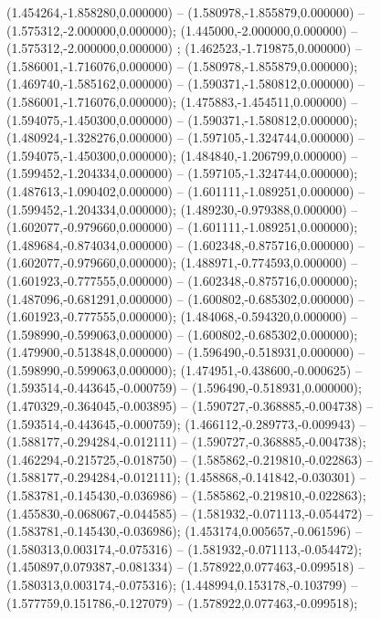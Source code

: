  (1.454264,-1.858280,0.000000) -- (1.580978,-1.855879,0.000000) -- (1.575312,-2.000000,0.000000);
 (1.445000,-2.000000,0.000000) -- (1.575312,-2.000000,0.000000) ;
 (1.462523,-1.719875,0.000000) -- (1.586001,-1.716076,0.000000) -- (1.580978,-1.855879,0.000000);
 (1.469740,-1.585162,0.000000) -- (1.590371,-1.580812,0.000000) -- (1.586001,-1.716076,0.000000);
 (1.475883,-1.454511,0.000000) -- (1.594075,-1.450300,0.000000) -- (1.590371,-1.580812,0.000000);
 (1.480924,-1.328276,0.000000) -- (1.597105,-1.324744,0.000000) -- (1.594075,-1.450300,0.000000);
 (1.484840,-1.206799,0.000000) -- (1.599452,-1.204334,0.000000) -- (1.597105,-1.324744,0.000000);
 (1.487613,-1.090402,0.000000) -- (1.601111,-1.089251,0.000000) -- (1.599452,-1.204334,0.000000);
 (1.489230,-0.979388,0.000000) -- (1.602077,-0.979660,0.000000) -- (1.601111,-1.089251,0.000000);
 (1.489684,-0.874034,0.000000) -- (1.602348,-0.875716,0.000000) -- (1.602077,-0.979660,0.000000);
 (1.488971,-0.774593,0.000000) -- (1.601923,-0.777555,0.000000) -- (1.602348,-0.875716,0.000000);
 (1.487096,-0.681291,0.000000) -- (1.600802,-0.685302,0.000000) -- (1.601923,-0.777555,0.000000);
 (1.484068,-0.594320,0.000000) -- (1.598990,-0.599063,0.000000) -- (1.600802,-0.685302,0.000000);
 (1.479900,-0.513848,0.000000) -- (1.596490,-0.518931,0.000000) -- (1.598990,-0.599063,0.000000);
 (1.474951,-0.438600,-0.000625) -- (1.593514,-0.443645,-0.000759) -- (1.596490,-0.518931,0.000000);
 (1.470329,-0.364045,-0.003895) -- (1.590727,-0.368885,-0.004738) -- (1.593514,-0.443645,-0.000759);
 (1.466112,-0.289773,-0.009943) -- (1.588177,-0.294284,-0.012111) -- (1.590727,-0.368885,-0.004738);
 (1.462294,-0.215725,-0.018750) -- (1.585862,-0.219810,-0.022863) -- (1.588177,-0.294284,-0.012111);
 (1.458868,-0.141842,-0.030301) -- (1.583781,-0.145430,-0.036986) -- (1.585862,-0.219810,-0.022863);
 (1.455830,-0.068067,-0.044585) -- (1.581932,-0.071113,-0.054472) -- (1.583781,-0.145430,-0.036986);
 (1.453174,0.005657,-0.061596) -- (1.580313,0.003174,-0.075316) -- (1.581932,-0.071113,-0.054472);
 (1.450897,0.079387,-0.081334) -- (1.578922,0.077463,-0.099518) -- (1.580313,0.003174,-0.075316);
 (1.448994,0.153178,-0.103799) -- (1.577759,0.151786,-0.127079) -- (1.578922,0.077463,-0.099518);
